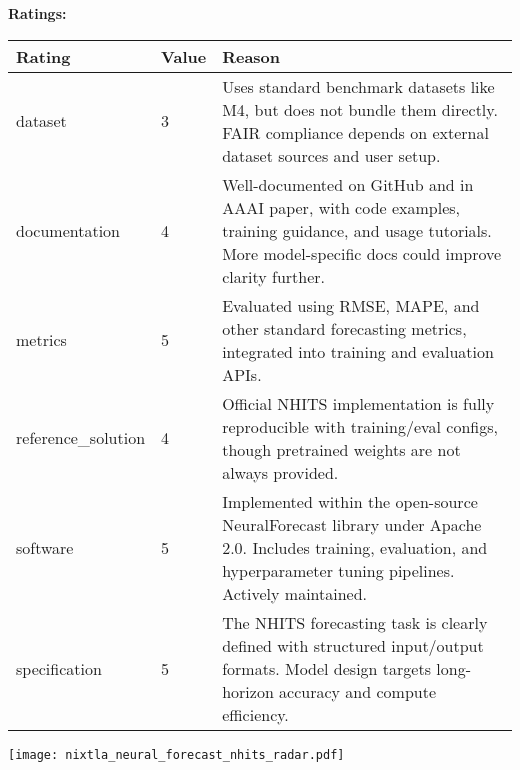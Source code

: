 {{{\bf Ratings:} ~ \\

\begin{tabular}{p{} p{} p{}}
\hline
Rating & Value & Reason \\
\hline
dataset & 3 & Uses standard benchmark datasets like M4, but does not bundle them directly.
FAIR compliance depends on external dataset sources and user setup.
 \\
documentation & 4 & Well-documented on GitHub and in AAAI paper, with code examples, training guidance,
and usage tutorials. More model-specific docs could improve clarity further.
 \\
metrics & 5 & Evaluated using RMSE, MAPE, and other standard forecasting metrics, integrated
into training and evaluation APIs.
 \\
reference\_solution & 4 & Official NHITS implementation is fully reproducible with training/eval configs,
though pretrained weights are not always provided.
 \\
software & 5 & Implemented within the open-source NeuralForecast library under Apache 2.0.
Includes training, evaluation, and hyperparameter tuning pipelines. Actively maintained.
 \\
specification & 5 & The NHITS forecasting task is clearly defined with structured input/output formats.
Model design targets long-horizon accuracy and compute efficiency.
 \\
\hline
\end{tabular}

\texttt{[image: nixtla\_neural\_forecast\_nhits\_radar.pdf]}
}}
\clearpage